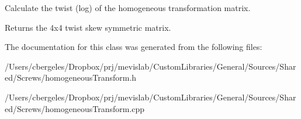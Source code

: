 Calculate the twist (log) of the homogeneous transformation matrix. 

\begin{DoxyReturn}{Returns}
the 4x4 twist skew symmetric matrix. 
\end{DoxyReturn}


The documentation for this class was generated from the following files\+:\begin{DoxyCompactItemize}
\item 
/\+Users/cbergeles/\+Dropbox/prj/mevislab/\+Custom\+Libraries/\+General/\+Sources/\+Shared/\+Screws/homogeneous\+Transform.\+h\item 
/\+Users/cbergeles/\+Dropbox/prj/mevislab/\+Custom\+Libraries/\+General/\+Sources/\+Shared/\+Screws/homogeneous\+Transform.\+cpp\end{DoxyCompactItemize}
